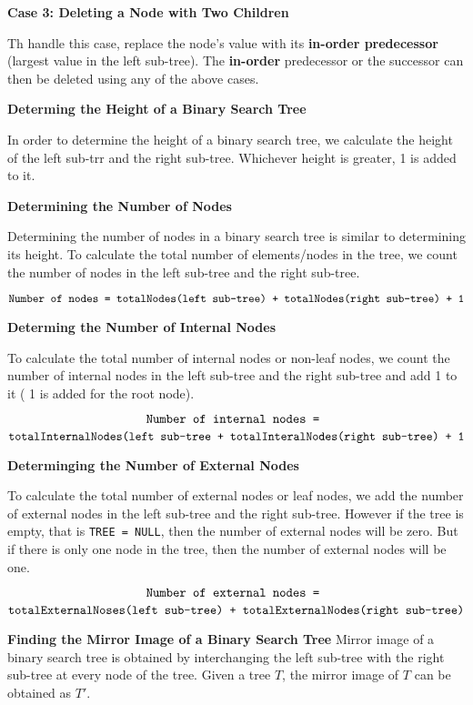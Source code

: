 \vskip 2mm
{\bf Case 3: Deleting a Node with Two Children}

\vskip 1mm
Th handle this case, replace the node's value with its {\bf in-order predecessor} (largest value in the left sub-tree). The {\bf in-order} predecessor or the successor can then be deleted using any of the above cases.

\filbreak
\vskip 1cm
{\bf Determing the Height of a Binary Search Tree}

\vskip 1mm
In order to determine the height of a binary search tree, we calculate the height of the left sub-trr and the right sub-tree. Whichever height is greater, 1 is added to it.

\filbreak
\vskip 1cm
{\bf Determining the Number of Nodes}

\vskip 1mm
Determining the number of nodes in a binary search tree is similar to determining its height. To calculate the total number of elements/nodes in the tree, we count the number of nodes in the left sub-tree and the right sub-tree.

$$\hbox{\tt Number of nodes = totalNodes(left sub-tree) + totalNodes(right sub-tree) + 1}$$

\vskip 3mm
{\bf Determing the Number of Internal Nodes}

\vskip 1mm
To calculate the total number of internal nodes or non-leaf nodes, we count the number of internal nodes in the left sub-tree and the right sub-tree and add 1 to it ( 1 is added for the root node).

$$\hbox{\tt Number of internal nodes = }$$
\vskip 1mm
$$\hbox{\tt totalInternalNodes(left sub-tree + totalInteralNodes(right sub-tree) + 1}$$

\vskip 2mm
{\bf Determinging the Number of External Nodes}

\vskip 1mm
To calculate the total number of external nodes or leaf nodes, we add the number of external nodes in the left sub-tree and the right sub-tree. However if the tree is empty, that is {\tt TREE = NULL}, then the number of external nodes will be zero. But if there is only one node in the tree, then the number of external nodes will be one.

$$\hbox{\tt Number of external nodes = }$$
\vskip 1mm
$$\hbox{\tt totalExternalNoses(left sub-tree) + totalExternalNodes(right sub-tree)}$$

\filbreak
\vskip 1cm
{\bf Finding the Mirror Image of a Binary Search Tree}
\vskip 1mm
Mirror image of a binary search tree is obtained by interchanging the left sub-tree with the right sub-tree at every node of the tree. Given a tree $T$, the mirror image of $T$ can be obtained as $T'$.

